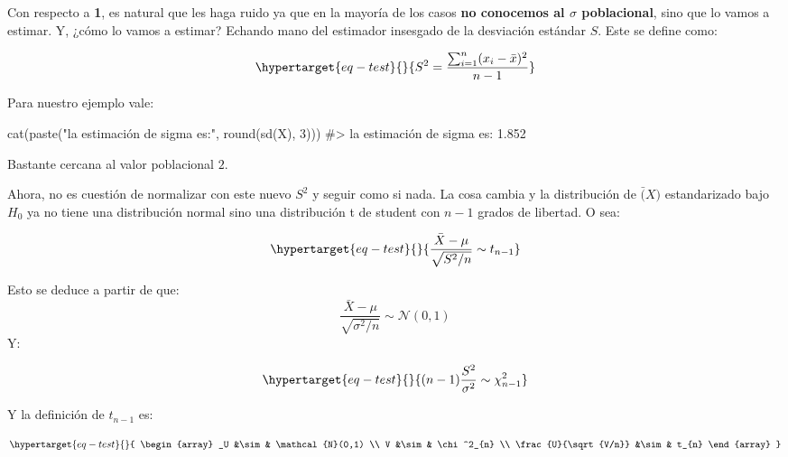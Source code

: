 \documentclass[
  letterpaper,
  DIV=11,
  numbers=noendperiod,
  oneside]{scrreprt}
\newenvironment{Shaded}{\begin{snugshade}}{\end{snugshade}}
\newcommand{\CommentTok}[1]{\textcolor[rgb]{0.37,0.37,0.37}{#1}}
\newcommand{\DecValTok}[1]{\textcolor[rgb]{0.68,0.00,0.00}{#1}}
\newcommand{\FunctionTok}[1]{\textcolor[rgb]{0.28,0.35,0.67}{#1}}
\newcommand{\NormalTok}[1]{\textcolor[rgb]{0.00,0.23,0.31}{#1}}
\newcommand{\StringTok}[1]{\textcolor[rgb]{0.13,0.47,0.30}{#1}}
\begin{document}
Con respecto a \textbf{1}, es natural que les haga ruido ya que en la
mayoría de los casos \textbf{no conocemos al \(\sigma\) poblacional},
sino que lo vamos a estimar. Y, ¿cómo lo vamos a estimar? Echando mano
del estimador insesgado de la desviación estándar \(S\). Este se define
como:

\begin{equation}\protect\hypertarget{eq-test}{}{
S^2 = \frac{\sum_{i=1}^n(x_i-\bar{x})^2}{n-1}
}\label{eq-test}\end{equation}

Para nuestro ejemplo vale:

\begin{Shaded}
\begin{Highlighting}[]
\FunctionTok{cat}\NormalTok{(}\FunctionTok{paste}\NormalTok{(}\StringTok{"la estimación de sigma es:"}\NormalTok{, }\FunctionTok{round}\NormalTok{(}\FunctionTok{sd}\NormalTok{(X), }\DecValTok{3}\NormalTok{)))}
\CommentTok{\#\textgreater{} la estimación de sigma es: 1.852}
\end{Highlighting}
\end{Shaded}

Bastante cercana al valor poblacional \(2\).

Ahora, no es cuestión de normalizar con este nuevo \(S^2\) y seguir como
si nada. La cosa cambia y la distribución de \(\bar(X)\) estandarizado
bajo \(H_0\) ya no tiene una distribución normal sino una distribución t
de student con \(n-1\) grados de libertad. O sea:

\begin{equation}\protect\hypertarget{eq-test}{}{
\frac{\bar{X} - \mu}{\sqrt{S^2/n}} \sim t_{n-1}
}\label{eq-test}\end{equation}

Esto se deduce a partir de que: \[
\frac{\bar{X} - \mu}{\sqrt{\sigma^2/n}} \sim \mathcal{N}(0,1)
\] Y:

\begin{equation}\protect\hypertarget{eq-test}{}{
(n-1)\frac{S^2}{\sigma^2} \sim \chi^2_{n-1}
}\label{eq-test}\end{equation}

Y la definición de \(t_{n-1}\) es:

\begin{equation}\protect\hypertarget{eq-test}{}{
\begin{array}
_U &\sim& \mathcal{N}(0,1) \\
V &\sim& \chi^2_{n} \\
\frac{U}{\sqrt{V/n}} &\sim& t_{n}
\end{array}
}\label{eq-test}\end{equation}
\end{document}
